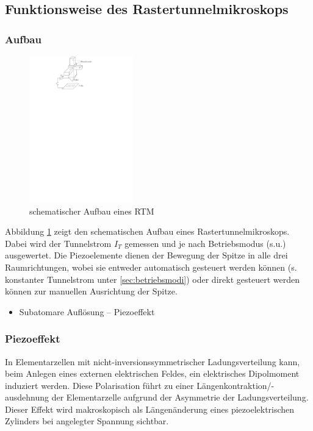 \documentclass[10pt, a4paper]{article}
\begin{document}
\subsection{Funktionsweise des Rastertunnelmikroskops}
\subsubsection{Aufbau}
\begin{figure}
\centering
\includegraphics[width=0.4\textwidth]{./grafiken/rtm_aufbau.pdf}
\caption{schematischer Aufbau eines RTM}
\label{fig:aufbau}
\end{figure}
Abbildung \ref{fig:aufbau} zeigt den schematischen Aufbau eines Rastertunnelmikroskops.
Dabei wird der Tunnelstrom $I_T$ gemessen und je nach Betriebsmodus (s.u.)  ausgewertet.
Die Piezoelemente dienen der Bewegung der Spitze in alle drei Raumrichtungen, wobei sie entweder automatisch gesteuert werden können (s. konstanter Tunnelstrom unter \ref{sec:betriebsmodi}) oder direkt gesteuert werden können zur manuellen Ausrichtung der Spitze.
\begin{itemize}
  \item Subatomare Auflösung -- Piezoeffekt
\end{itemize}
\subsubsection{Piezoeffekt}
In Elementarzellen mit nicht-inversionssymmetrischer Ladungsverteilung kann, beim Anlegen eines externen elektrischen Feldes, ein elektrisches Dipolmoment induziert werden.
Diese Polarisation führt zu einer Längenkontraktion/-ausdehnung der Elementarzelle aufgrund der Asymmetrie der Ladungsverteilung.
Dieser Effekt wird makroskopisch als Längenänderung eines piezoelektrischen Zylinders bei angelegter Spannung sichtbar.
\end{document}
